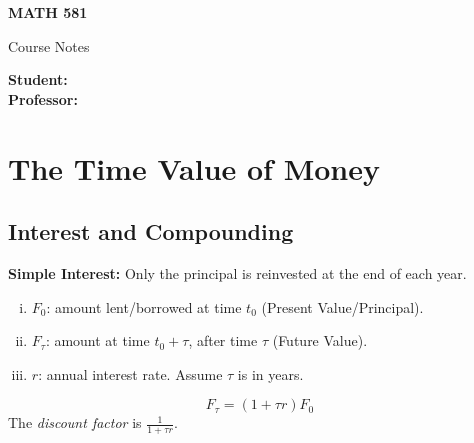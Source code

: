 



\usepackage{tikz}
\usepackage{slashed}
\usetikzlibrary{calc}
\usepackage{amsmath}
\usepackage{amsthm}
\usepackage{amssymb}
\usepackage{geometry}
\usepackage{xcolor}
\usepackage{booktabs} %
\usepackage{tabularx} %
\usepackage{enumerate}
\usepackage{enumitem}
\usepackage{framed} %



\begin{Large}
    \textsf{\textbf{MATH 581}}

    Course Notes
\end{Large}

\vspace{1ex}

\textsf{\textbf{Student:}} \\
\textsf{\textbf{Professor:}} \\
\setcounter{tocdepth}{2}

{
  \setlength{\parskip}{0pt}
  \linespread{0.9} %
  \tableofcontents
} %
\setcounter{section}{1}
\section{The Time Value of Money}
\subsection{Interest and Compounding}
\textbf{Simple Interest: } Only the principal is reinvested at the end of each year.
\begin{enumerate}[i.]
    \item \(F_0\): amount lent/borrowed at time \(t_0\) (Present Value/Principal).
    \item \(F_\tau\): amount at time \(t_0 + \tau\), after time \(\tau\) (Future Value).
    \item \(r\): annual interest rate. Assume \(\tau\) is in years.
\end{enumerate}
\begin{equation*}
    F_\tau = (1+\tau r)F_0
\end{equation*}
The \textit{discount factor} is \(\frac{1}{1+\tau r}\).

